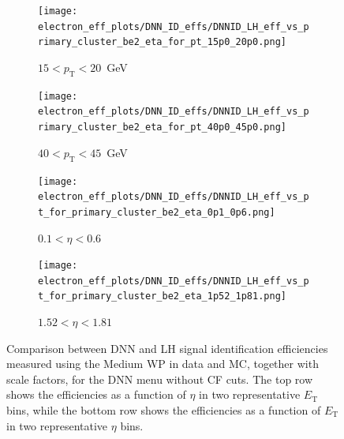 \begin{figure}[htbp]
  \centering

  \begin{subfigure}[b]{0.48\textwidth}
    \centering
    \texttt{[image: electron\_eff\_plots/DNN\_ID\_effs/DNNID\_LH\_eff\_vs\_primary\_cluster\_be2\_eta\_for\_pt\_15p0\_20p0.png]}
    \caption{$15 < p_{\mathrm{T}} < 20$~GeV}
    \label{fig:eff_dnn_lh_15_20}
  \end{subfigure}
  \hfill
  \begin{subfigure}[b]{0.48\textwidth}
    \centering
    \texttt{[image: electron\_eff\_plots/DNN\_ID\_effs/DNNID\_LH\_eff\_vs\_primary\_cluster\_be2\_eta\_for\_pt\_40p0\_45p0.png]}
    \caption{$40 < p_{\mathrm{T}} < 45$~GeV}
    \label{fig:eff_dnn_lh_40_45}
  \end{subfigure}

  \vspace{0.5cm}

  \begin{subfigure}[b]{0.48\textwidth}
    \centering
    \texttt{[image: electron\_eff\_plots/DNN\_ID\_effs/DNNID\_LH\_eff\_vs\_pt\_for\_primary\_cluster\_be2\_eta\_0p1\_0p6.png]}
    \caption{$0.1 < \eta < 0.6$}
    \label{fig:eff_dnn_lh_0p1_0p6}
  \end{subfigure}
  \hfill
  \begin{subfigure}[b]{0.48\textwidth}
    \centering
    \texttt{[image: electron\_eff\_plots/DNN\_ID\_effs/DNNID\_LH\_eff\_vs\_pt\_for\_primary\_cluster\_be2\_eta\_1p52\_1p81.png]}
    \caption{$1.52 < \eta < 1.81$}
    \label{fig:eff_dnn_lh_1p52_1p81}
  \end{subfigure}

  \caption{
    Comparison between DNN and LH signal identification efficiencies measured using the Medium WP in data and MC, together with scale factors, 
    for the DNN menu without CF cuts. The top row shows the efficiencies as a function of $\eta$ in two representative $E_{\mathrm{T}}$ bins, 
    while the bottom row shows the efficiencies as a function of $E_{\mathrm{T}}$ in two representative $\eta$ bins.}
  \label{fig:eff_sfs_dnn_vs_lh_bins}
\end{figure}


